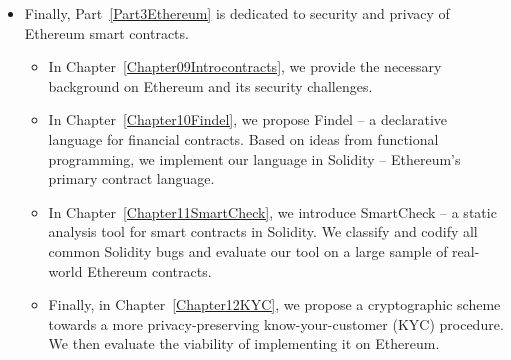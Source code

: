 \begin{itemize}
	\item
	Finally, Part~\ref{Part3Ethereum} is dedicated to security and privacy of Ethereum smart contracts.
	\begin{itemize}
		\item 
	In Chapter~\ref{Chapter09Introcontracts}, we provide the necessary background on Ethereum and its security challenges.
		\item
	In Chapter~\ref{Chapter10Findel}, we propose Findel -- a declarative language for financial contracts.
	Based on ideas from functional programming, we implement our language in Solidity -- Ethereum's primary contract language.
		\item
	In Chapter~\ref{Chapter11SmartCheck}, we introduce SmartCheck -- a static analysis tool for smart contracts in Solidity.
	We classify and codify all common Solidity bugs and evaluate our tool on a large sample of real-world Ethereum contracts.
		\item
	Finally, in Chapter~\ref{Chapter12KYC}, we propose a cryptographic scheme towards a more privacy-preserving know-your-customer (KYC) procedure.
	We then evaluate the viability of implementing it on Ethereum.
	\end{itemize}
\end{itemize}













